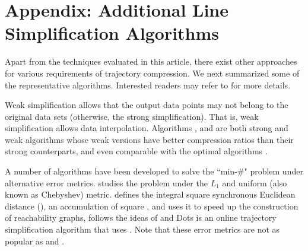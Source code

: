 \section*{Appendix: Additional Line Simplification Algorithms}
Apart from the techniques evaluated in this article, there exist other approaches for various requirements of trajectory compression.
We next summarized some of the representative \lsa algorithms. Interested readers may refer to \cite{Shi:Survey, Muckell:Compression, Lin:Cised, Zhang:Evaluation} for more details. %





Weak simplification allows that the output data points may not belong to the original data sets \cite{Trajcevski:DDR} (otherwise, the strong simplification).
That is, weak simplification allows data interpolation. Algorithms \sleeve \cite{Zhao:Sleeve}, \operb\cite{Lin:Operb} and \cised \cite{Lin:Cised} are both strong and weak \lsa algorithms whose weak versions have better compression ratios than their strong counterparts, and even comparable with the optimal algorithms \cite{Lin:Cised}.

A number of algorithms \cite{Agarwal:Metric, Chen:Fast, Wu:Graph,Cao:Dots} have been developed to solve the ``min-\#" problem under alternative error metrics.
\cite{Agarwal:Metric} studies the problem under the $L_1$ and uniform (also known as Chebyshev) metric. %
\cite{Chen:Fast} defines  the integral square synchronous Euclidean distance (), an accumulation of square \sed, and uses it to speed up the construction of reachability graphs, \cite{Wu:Graph} follows the ideas of \cite{Chen:Fast} and Dots \cite{Cao:Dots} is an online  trajectory simplification algorithm that uses .
Note that these error metrics are not as popular as \ped and \sed.


